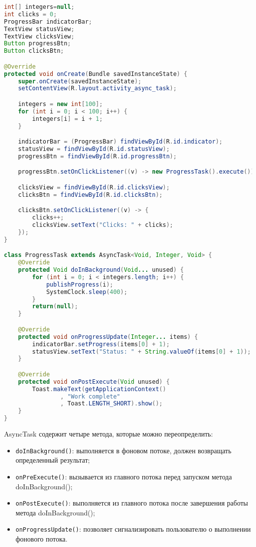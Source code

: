 \begin{lstlisting}[language=Java
	, label=lst:java:async-task
	]
int[] integers=null;
int clicks = 0;
ProgressBar indicatorBar;
TextView statusView;
TextView clicksView;
Button progressBtn;
Button clicksBtn;

@Override
protected void onCreate(Bundle savedInstanceState) {
	super.onCreate(savedInstanceState);
	setContentView(R.layout.activity_async_task);

	integers = new int[100];
	for (int i = 0; i < 100; i++) {
		integers[i] = i + 1;
	}

	indicatorBar = (ProgressBar) findViewById(R.id.indicator);
	statusView = findViewById(R.id.statusView);
	progressBtn = findViewById(R.id.progressBtn);

	progressBtn.setOnClickListener((v) -> new ProgressTask().execute());

	clicksView = findViewById(R.id.clicksView);
	clicksBtn = findViewById(R.id.clicksBtn);

	clicksBtn.setOnClickListener((v) -> {
		clicks++;
		clicksView.setText("Clicks: " + clicks);
	});
}

class ProgressTask extends AsyncTask<Void, Integer, Void> {
	@Override
	protected Void doInBackground(Void... unused) {
		for (int i = 0; i < integers.length; i++) {
			publishProgress(i);
			SystemClock.sleep(400);
		}
		return(null);
	}

	@Override
	protected void onProgressUpdate(Integer... items) {
		indicatorBar.setProgress(items[0] + 1);
		statusView.setText("Status: " + String.valueOf(items[0] + 1));
	}

	@Override
	protected void onPostExecute(Void unused) {
		Toast.makeText(getApplicationContext()
				, "Work complete"
				, Toast.LENGTH_SHORT).show();
	}
}
\end{lstlisting}

AsyncTask содержит четыре метода, которые можно переопределить:

\begin{itemize}
	\item \texttt{doInBackground()}: выполняется в фоновом потоке,
		должен возвращать определенный результат;
	\item \texttt{onPreExecute()}: вызывается из главного потока перед
		запуском метода doInBackground();
	\item \texttt{onPostExecute()}: выполняется из главного потока после
		завершения работы метода doInBackground();
	\item \texttt{onProgressUpdate()}: позволяет сигнализировать
		пользователю о выполнении фонового потока.
\end{itemize}

